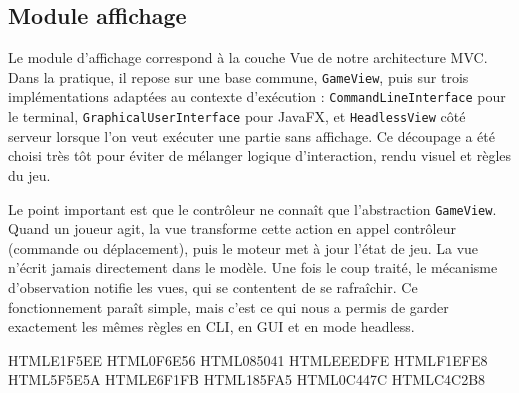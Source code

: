 \documentclass[a4paper]{article}
\begin{document}
\subsection{Module affichage}

Le module d'affichage correspond à la couche Vue de notre architecture MVC. Dans la pratique, il repose sur une base commune, \texttt{GameView}, puis sur trois 
implémentations adaptées au contexte d'exécution : \texttt{CommandLineInterface} pour le terminal, \texttt{GraphicalUserInterface} pour JavaFX, et \texttt{HeadlessView}
 côté serveur lorsque l'on veut exécuter une partie sans affichage. Ce découpage a été choisi très tôt pour éviter de mélanger logique d'interaction, rendu visuel et règles du jeu.

Le point important est que le contrôleur ne connaît que l'abstraction \texttt{GameView}. Quand un joueur agit, la vue transforme cette action en appel contrôleur 
(commande ou déplacement), puis le moteur met à jour l'état de jeu. La vue n'écrit jamais directement dans le modèle. Une fois le coup traité, le mécanisme d'observation 
notifie les vues, qui se contentent de se rafraîchir. Ce fonctionnement paraît simple, mais c'est ce qui nous a permis de garder exactement les mêmes règles en CLI,
 en GUI et en mode headless.

\definecolor{pdp-teal50}  {HTML}{E1F5EE}
\definecolor{pdp-teal600} {HTML}{0F6E56}
\definecolor{pdp-teal800} {HTML}{085041}
\definecolor{pdp-purple50} {HTML}{EEEDFE}
\definecolor{pdp-gray50}  {HTML}{F1EFE8}
\definecolor{pdp-gray600} {HTML}{5F5E5A}
\definecolor{pdp-blue50}  {HTML}{E6F1FB}
\definecolor{pdp-blue600} {HTML}{185FA5}
\definecolor{pdp-blue800} {HTML}{0C447C}
\definecolor{pdp-border}  {HTML}{C4C2B8}

\end{document}
